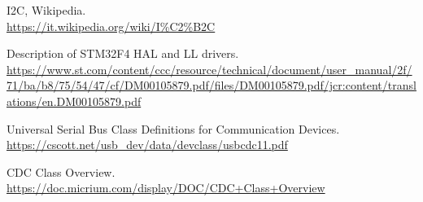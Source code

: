 \begin{thebibliography}{99}
I2C, Wikipedia.\\
\url{https://it.wikipedia.org/wiki/I%C2%B2C}
	
Description of STM32F4 HAL and LL drivers.\\
\url{https://www.st.com/content/ccc/resource/technical/document/user_manual/2f/71/ba/b8/75/54/47/cf/DM00105879.pdf/files/DM00105879.pdf/jcr:content/translations/en.DM00105879.pdf}

Universal Serial Bus Class Definitions for Communication Devices.\\
\url{https://cscott.net/usb_dev/data/devclass/usbcdc11.pdf}

CDC Class Overview.\\
\url{https://doc.micrium.com/display/DOC/CDC+Class+Overview}

\end{thebibliography}



